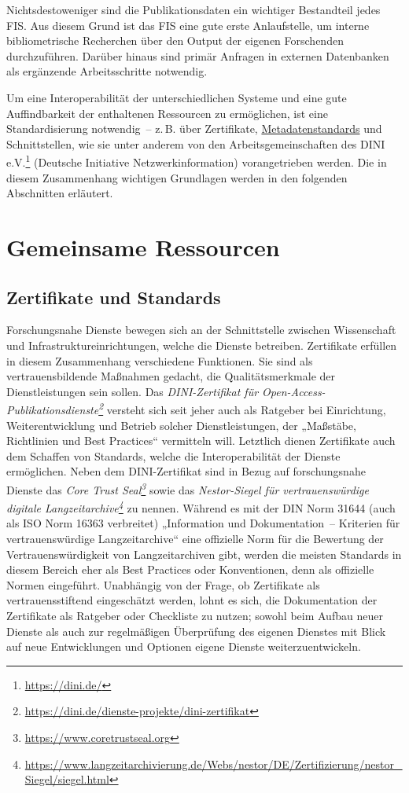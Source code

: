 \documentclass[
  11pt,
  letterpaper,
  DIV=11,
  twoside]{scrreprt}
\DeclareRobustCommand{\href}[2]{#2\footnote{\url{#1}}}
\begin{document}
Nichtsdestoweniger sind die Publikationsdaten ein wichtiger Bestandteil
jedes {FIS}. Aus diesem Grund ist das {FIS} eine gute erste
Anlaufstelle, um interne bibliometrische Recherchen über den Output der
eigenen Forschenden durchzuführen. Darüber hinaus sind primär Anfragen
in externen Datenbanken als ergänzende Arbeitsschritte notwendig.

Um eine Interoperabilität der unterschiedlichen Systeme und eine gute
Auffindbarkeit der enthaltenen Ressourcen zu ermöglichen, ist eine
Standardisierung notwendig~-- z.\,B. über Zertifikate,
\hyperref[metadatenstandards]{Metadatenstandards} und Schnittstellen,
wie sie unter anderem von den Arbeitsgemeinschaften des
\href{https://dini.de/}{DINI e.V.} (Deutsche Initiative
Netzwerkinformation) vorangetrieben werden. Die in diesem Zusammenhang
wichtigen Grundlagen werden in den folgenden Abschnitten erläutert.

\section{Gemeinsame Ressourcen}\label{gemeinsame-ressourcen}

\subsection{Zertifikate und Standards}\label{zertifikate-und-standards}

Forschungsnahe Dienste bewegen sich an der Schnittstelle zwischen
Wissenschaft und Infrastruktureinrichtungen, welche die Dienste
betreiben. Zertifikate erfüllen in diesem Zusammenhang verschiedene
Funktionen. Sie sind als vertrauensbildende Maßnahmen gedacht, die
Qualitätsmerkmale der Dienstleistungen sein sollen. Das
\emph{\href{https://dini.de/dienste-projekte/dini-zertifikat}{DINI-Zertifikat
für Open-Access-Publikationsdienste}} versteht sich seit jeher auch als
Ratgeber bei Einrichtung, Weiterentwicklung und Betrieb solcher
Dienstleistungen, der „Maßstäbe, Richtlinien und Best Practices``
vermitteln will. Letztlich dienen Zertifikate auch dem Schaffen von
Standards, welche die Interoperabilität der Dienste ermöglichen. Neben
dem DINI-Zertifikat sind in Bezug auf forschungsnahe Dienste das
\emph{\href{https://www.coretrustseal.org}{Core Trust Seal}} sowie das
\emph{\href{https://www.langzeitarchivierung.de/Webs/nestor/DE/Zertifizierung/nestor_Siegel/siegel.html}{Nestor-Siegel
für vertrauenswürdige digitale Langzeitarchive}} zu nennen. Während es
mit der DIN Norm 31644 (auch als ISO Norm 16363 verbreitet) „Information
und Dokumentation~-- Kriterien für vertrauenswürdige Langzeitarchive``
eine offizielle Norm für die Bewertung der Vertrauenswürdigkeit von
Langzeitarchiven gibt, werden die meisten Standards in diesem Bereich
eher als Best Practices oder Konventionen, denn als offizielle Normen
eingeführt. Unabhängig von der Frage, ob Zertifikate als
vertrauensstiftend eingeschätzt werden, lohnt es sich, die Dokumentation
der Zertifikate als Ratgeber oder Checkliste zu nutzen; sowohl beim
Aufbau neuer Dienste als auch zur regelmäßigen Überprüfung des eigenen
Dienstes mit Blick auf neue Entwicklungen und Optionen eigene Dienste
weiterzuentwickeln.
\end{document}
